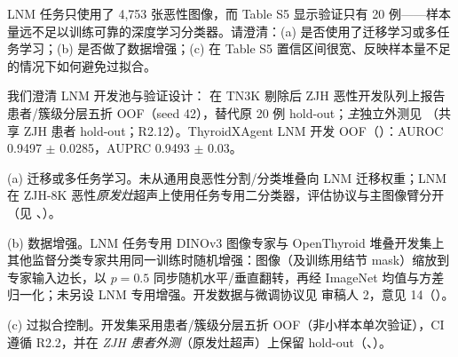 \begin{reviewercomment}
LNM 任务只使用了 4,753 张恶性图像，而 Table S5 显示验证只有 20 例——样本量远不足以训练可靠的深度学习分类器。请澄清：(a) 是否使用了迁移学习或多任务学习；(b) 是否做了数据增强；(c) 在 Table S5 置信区间很宽、反映样本量不足的情况下如何避免过拟合。
\end{reviewercomment}
\begin{authorresponse}
我们澄清 LNM 开发池与验证设计： 在 TN3K 剔除后 ZJH 恶性开发队列上报告患者/簇级分层五折 OOF（seed 42），替代原 20 例 hold-out；\emph{主}独立外测见 （共享 ZJH 患者 hold-out；R2.12）。ThyroidXAgent LNM 开发 OOF（）：AUROC 0.9497 $\pm$ 0.0285，AUPRC 0.9493 $\pm$ 0.03。\par
(a) 迁移或多任务学习。未从通用良恶性分割/分类堆叠向 LNM 迁移权重；LNM 在 ZJH-8K 恶性\emph{原发灶}超声上使用任务专用二分类器，评估协议与主图像臂分开（见 、）。\par
(b) 数据增强。LNM 任务专用 DINOv3 图像专家与 OpenThyroid 堆叠开发集上其他监督分类专家共用同一训练时随机增强：图像（及训练用结节 mask）缩放到专家输入边长，以 $p{=}0.5$ 同步随机水平/垂直翻转，再经 ImageNet 均值与方差归一化；未另设 LNM 专用增强。开发数据与微调协议见 审稿人 2，意见 14（）。\par
(c) 过拟合控制。开发集采用患者/簇级分层五折 OOF（非小样本单次验证），CI 遵循 R2.2，并在 \emph{ZJH 患者外测}（原发灶超声）上保留 hold-out（、）。\par
\par
\end{authorresponse}

